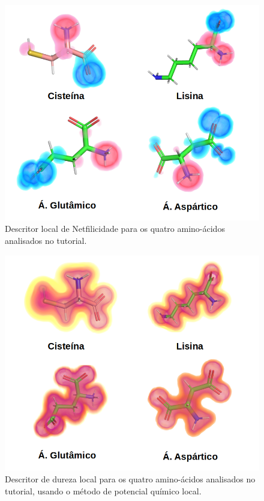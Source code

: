 \documentclass[a4paper,11pt]{refart}
\begin{document}
\hspace*{-\leftmarginwidth}
\begin{minipage}{\fullwidth}
	\begin{figure}[H]
		\begin{center}
			\includegraphics[width=5in]{images/tut4_img15}
			\caption{Descritor local de Netfilicidade para os quatro amino-ácidos analisados no tutorial.}
			\label{fig_tut4_13}
		\end{center}
	\end{figure}
\end{minipage}

\hspace*{-\leftmarginwidth}
\begin{minipage}{\fullwidth}
	\begin{figure}[H]
		\begin{center}
			\includegraphics[width=5in]{images/tut4_img16}
			\caption{Descritor de dureza local para os quatro amino-ácidos analisados no tutorial, usando o método de potencial químico local.}
			\label{fig_tut4_14}
		\end{center}
	\end{figure}
\end{minipage}
\end{document}
